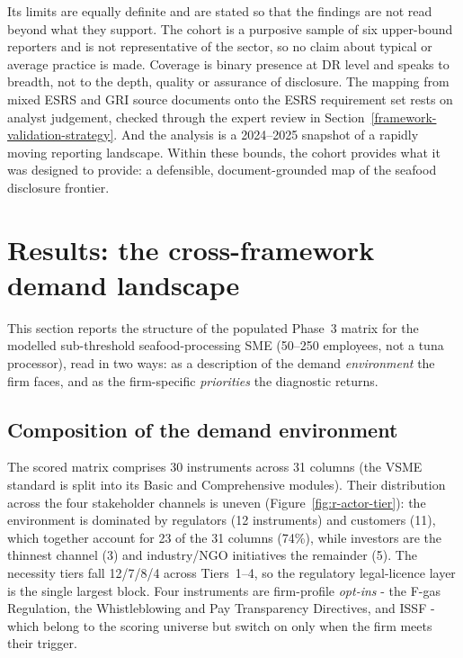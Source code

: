 \documentclass[
]{article}
\begin{document}
Its limits are equally definite and are stated so that the findings are
not read beyond what they support. The cohort is a purposive sample of six
upper-bound reporters and is not representative of the sector, so no claim
about typical or average practice is made. Coverage is binary presence at
DR level and speaks to breadth, not to the depth, quality or assurance of
disclosure. The mapping from mixed ESRS and GRI source documents onto the
ESRS requirement set rests on analyst judgement, checked through the expert
review in Section~\ref{framework-validation-strategy}. And the analysis is a
2024--2025 snapshot of a rapidly moving reporting landscape. Within these
bounds, the cohort provides what it was designed to provide: a defensible,
document-grounded map of the seafood disclosure frontier.

\section{Results: the cross-framework demand landscape}
\label{results-demand-landscape}

This section reports the structure of the populated Phase~3 matrix for
the modelled sub-threshold seafood-processing SME (50--250 employees,
not a tuna processor), read in two ways: as a description of the demand
\emph{environment} the firm faces, and as the firm-specific
\emph{priorities} the diagnostic returns.

\subsection{Composition of the demand environment}

The scored matrix comprises 30 instruments across 31 columns (the VSME
standard is split into its Basic and Comprehensive modules). Their
distribution across the four stakeholder channels is uneven
(Figure~\ref{fig:r-actor-tier}): the environment is dominated by
regulators (12 instruments) and customers (11), which together account
for 23 of the 31 columns (74\%), while investors are the thinnest channel
(3) and industry/NGO initiatives the remainder (5). The necessity tiers
fall 12/7/8/4 across Tiers~1--4, so the regulatory legal-licence layer is
the single largest block. Four instruments are firm-profile
\emph{opt-ins} - the F-gas Regulation, the Whistleblowing and Pay
Transparency Directives, and ISSF - which belong to the scoring universe
but switch on only when the firm meets their trigger.
\end{document}

